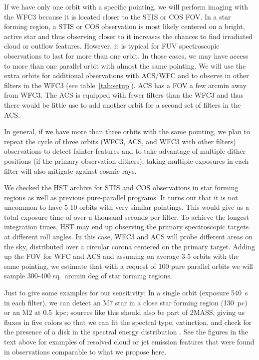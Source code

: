 \documentclass[12pt]{article}
\begin{document}
If we have only one orbit with a specific pointing, we will perform imaging with the WFC3 because it is located closer to the STIS or COS FOV. In a star forming region, a STIS or COS observation is most likely centered on a bright, active star and thus observing closer to it increases the chances to find irradiated cloud or outflow features. However,
it is typical for FUV spectroscopic observations to last for more than one orbit. In those cases, we may have access to more than one parallel orbit with almost the same pointing. We will use the extra orbits for additional observations with ACS/WFC and to observe in other filters in the WFC3 (see table~\ref{tab:setup}). ACS has a FOV a few arcmin away from WFC3. The ACS is equipped with fewer filters than the WFC3 and thus there would be little use to add another orbit for a second set of filters in the ACS.

In general, if we have more than three orbits with the same pointing, we plan to repeat the cycle of three orbits (WFC3, ACS, and WFC3 with other filters) observations to detect fainter features and to take advantage of multiple dither positions (if the primary observation dithers); taking multiple exposures in each filter will also mitigate against cosmic rays. 

We checked the HST archive for STIS and COS observations in star forming regions as well as previous pure-parallel programs. It turns out that it is not uncommon to have 5-10 orbits with very similar pointings. This would give us a total exposure time of over a thousand seconds per filter. To achieve the longest integration times, HST may end up observing the primary spectroscopic targets at different roll angles. In this case, WFC3 and ACS will probe different areas on the sky, distributed over a circular corona centered on the primary target. Adding up the FOV for WFC and ACS and assuming on average 3-5 orbits with the same pointing, we estimate that with a request of 100 pure parallel orbits we will sample 300-400 sq.\ arcmin deg of star forming regions.

Just to give some examples for our sensitivity: In a single orbit (exposure 540~s in each filter), we can detect an M7 star in a close star forming region (130~pc) or an M2 at 0.5~kpc; sources like this should also be part of 2MASS, giving us fluxes in five colors so that we can fit the spectral type, extinction, and check for the presence of a disk in the spectral energy distribution \citep[SED, using models from][]{2007ApJS..169..328R}.
See the figures in the text above for examples of resolved cloud or jet emission features that were found in observations comparable to what we propose here.
\end{document}
